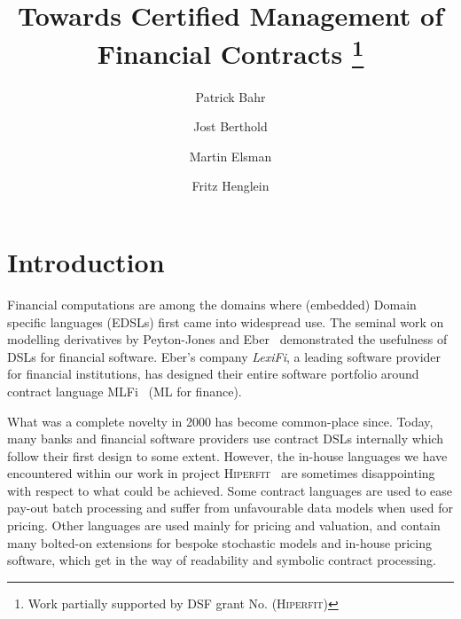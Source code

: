 \documentclass[a4paper,debug,twocolumn]{easychair}
\newcommand{\comm}[3][red]{{\small \color{#1}{$\spadesuit$#2: #3}}}
\newcommand{\jbcomment}[1]{\comm[orange]{jb}{#1}}
\theoremstyle{plain}
\begin{document}
\title{Towards Certified Management of Financial Contracts
\thanks{Work partially supported by DSF grant No.\jbcomment{yaddayadda} (\textsc{Hiperfit})}}


\author{Patrick Bahr
    \and
        Jost Berthold 
    \and 
        Martin Elsman 
    \and 
        Fritz Henglein\\
}



\clearpage
\maketitle

\section{Introduction}

Financial computations are among the domains where (embedded) Domain specific
languages (EDSLs) first came into widespread use.
The seminal work on modelling derivatives by Peyton-Jones and Eber~\cite{SPJ2000}
demonstrated the usefulness of DSLs for financial software.
%
Eber's company \emph{LexiFi}, a leading software provider
for financial institutions, has designed their entire software portfolio
around contract language MLFi~\cite{MLFi} (ML for finance).

What was a complete novelty in 2000 has become common-place since.
Today, many banks and financial software providers use contract DSLs internally
which follow their first design to some extent.
However, the in-house languages we have encountered within our work in project
\textsc{Hiperfit}~\cite{TFP11Hiperfit} are sometimes disappointing with respect
to what could be achieved.
%
Some contract languages are used to ease pay-out batch processing and suffer
from unfavourable data models when used for pricing.
%
Other languages are used mainly for pricing and valuation, and contain many
bolted-on extensions for bespoke stochastic models and in-house pricing
software, which get in the way of readability and symbolic contract processing.
\jbcomment{tone down? how to substantiate it?}
\end{document}

